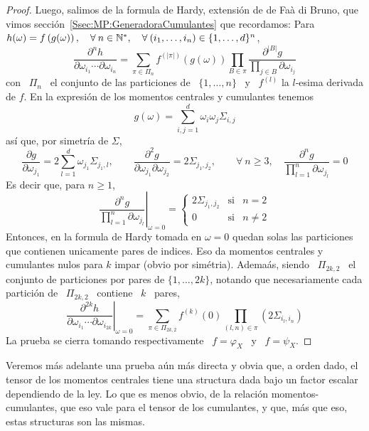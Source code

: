 \begin{proof}
  Luego, salimos de  la formula de Hardy, extensi\'on de de  Fa\`a di Bruno, que
  vimos  secci\'on~\ref{Ssec:MP:GeneradoraCumulantes}  que  recordamos:  Para  \
  $h(\omega) = f\left( g(\omega) \right),  \quad \forall \: n \in \mathbb{N}^*, \quad
  \forall \: (i_1 , \ldots , i_n ) \in \{ 1 , \ldots , d \}^n$,
  \[
  \frac{\partial^n  h}{\partial  \omega_{i_1}  \cdots \partial  \omega_{i_n}}  =
  \sum_{\pi  \in \Pi_n}  f^{(|\pi|)}\left( g(\omega)  \right) \prod_{B  \in \pi}
  \frac{\partial^{|B|} g}{\displaystyle \prod_{j \in B} \partial \omega_{i_j}}
  \]
  con \ $\Pi_n$  \ el conjunto de las  particiones de \ $\{ 1  , \ldots , n
  \}$ \ y \ $f^{(l)}$  la $l$-esima  derivada  de $f$.   En  la  expresi\'on de  los
  momentos centrales y cumulantes tenemos
  \[
  g(\omega) = \sum_{i,j=1}^d \omega_i \omega_j \Sigma_{i,j}
  \]
  as\'i que, por simetr\'ia de $\Sigma$,
  \[
  \frac{\partial  g}{\partial   \omega_{j_1}}  =  2   \sum_{l=1}^d  \omega_{j_1}
  \Sigma_{j_1,l},  \qquad  \frac{\partial^2  g}{\partial  \omega_{j_1}  \partial
    \omega_{j_2}}  =  2 \Sigma_{j_1,j_2},  \qquad  \forall  \:  n \ge  3,  \quad
  \frac{\partial^n g}{\prod_{l=1}^n \partial \omega_{j_l}} = 0
  \]
  Es decir que, para $n \ge 1$,
  \[
  \left.      \frac{\partial^n    g}{\prod_{l=1}^n     \partial    \omega_{j_l}}
  \right|_{\omega = 0} = \left\{\begin{array}{ccl}
  2   \Sigma_{j_1,j_2} & \mbox{si} & n = 2\\[2mm]
  0 & \mbox{si} & n \ne 2
  \end{array}\right.
  \]
  Entonces,  en la formula  de Hardy  tomada en  $\omega =  0$ quedan  solas las
  particiones  que  contienen unicamente  pares  de  indices.   Eso da  momentos
  centrales y cumulantes nulos para $k$ impar (obvio por sim\'etria). Adema\'as,
  siendo \  $\Pi_{2 k , 2}$  \ el conjunto de  particiones por pares de  $\{ 1 ,
  \ldots , 2 k \}$, notando que necesariamente cada partici\'on de \ $\Pi_{2 k ,
    2}$ \ contiene \ $k$ \ pares,
  \[
  \left.   \frac{\partial^{2  k}   h}{\partial   \omega_{i_1}  \cdots   \partial
      \omega_{i_{2  k}}}\right|_{\omega =  0} =  \sum_{\pi  \in \Pi_{2  k ,  2}}
  f^{(k)}(0) \prod_{(l,n) \in \pi} \left( 2 \Sigma_{i_l,i_n} \right)
  \]
  La prueba  se cierra  tomando respectivamente  \ $f =  \varphi_X$ \  y \  $f =
  \psi_X$.
\end{proof}
%
Veremos m\'as adelante una prueba a\'un m\'as directa y obvia que, a orden dado,
el tensor  de los  momentos centrales  tiene una structura  dada bajo  un factor
escalar  dependiendo  de la  ley.   Lo  que es  menos  obvio,  de la  relaci\'on
momentos-cumulantes, que eso vale para el tensor de los cumulantes, y que, m\'as
que eso, estas structuras son las mismas.

